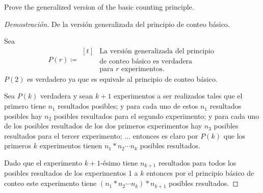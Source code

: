 \item Prove the generalized version of the basic counting principle.
\begin{proof}[Demostración] De la versión generalizada del principio de conteo básico.

    Sea
    \[
        P(r) \coloneqq \begin{aligned}[t]
            &\text{La versión generalizada del principio}\\
            &\text{de conteo básico es verdadera}\\
            &\text{para $r$ experimentos.}
        \end{aligned}
    \]
    $P(2)$ es verdadero ya que es equivale al principio de conteo básico.

    Sea $P(k)$ verdadera y sean $k+1$ experimentos a ser realizados tales que el primero tiene $n_1$ resultados posibles; y para cada uno de estos $n_1$ resultados posibles hay $n_2$ posibles resultados para el segundo experimento; y para cada uno de los posibles resultados de los dos primeros experimentos hay $n_3$ posibles resultados para el tercer experimento; $\dots$ entonces es claro por $P(k)$ que los primeros $k$ experimentos tienen $n_1 * n_2 \cdots n_k$ posibles resultados.

    Dado que el experimento $k+1$-ésimo tiene $n_{k+1}$ resultados para todos los posibles resultados de los experimentos 1 a $k$ entonces por el principio básico de conteo este experimento tiene $(n_1 * n_2 \cdots n_k) * n_{k+1}$ posibles resultados. \qedhere
\end{proof}